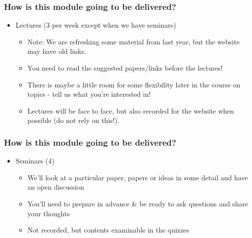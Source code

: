 \documentclass[]{article}
\begin{document}
\begin{frame}
	\frametitle{How is this module going to be delivered?}

	\begin{itemize}
		\item<+-> Lectures (3 per week except when we have seminars)
		\begin{itemize}
			\item Note: We are refreshing some material from last year, but the website may have old links.
			\item You need to read the suggested papers/links before the lectures!
			\item There is maybe a little room for some flexibility later in the course on topics - tell us what you're interested in!
			\item<+-> Lectures will be face to face, but also recorded for the website when possible (do not rely on this!).
		\end{itemize}
	\end{itemize}
\end{frame}

\begin{frame}
	\frametitle{How is this module going to be delivered?}

	\begin{itemize}
		\item<+-> Seminars (4)
		\begin{itemize}
			\item We'll look at a particular paper, papers or ideas in some detail and have an open discussion
			\item You'll need to prepare in advance \& be ready to ask questions and share your thoughts
			\item Not recorded, but contents examinable in the quizzes
		\end{itemize}
	\end{itemize}
\end{frame}
\end{document}
